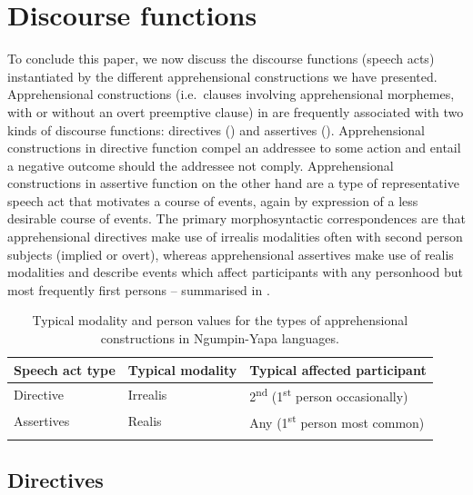 \documentclass[output=paper,colorlinks,citecolor=brown]{langscibook}
\begin{document}
\section{Discourse functions}
\label{sec:discourse}

To conclude this paper, we now discuss the discourse functions (speech acts) instantiated by the different apprehensional constructions we have presented. Apprehensional constructions (i.e.\  clauses involving apprehensional morphemes, with or without an overt preemptive clause) in  are frequently associated with two kinds of discourse functions: directives () and assertives (). Apprehensional constructions in directive function compel an addressee to some action and entail a negative outcome should the addressee not comply. Apprehensional constructions in assertive function on the other hand are a type of representative speech act that motivates a course of events, again by expression of a less desirable course of events. The primary morphosyntactic correspondences are that apprehensional directives make use of irrealis modalities often with second person subjects (implied or overt), whereas apprehensional assertives make use of realis modalities and describe events which affect participants with any personhood but most frequently first persons -- summarised in .

\begin{table}

\caption{Typical modality and person values for the types of apprehensional constructions in Ngumpin-Yapa languages.}
\label{tab9-bro}
\begin{tabular}{lll}
\lsptoprule
Speech act type & Typical modality & Typical affected participant \\ \midrule
Directive & Irrealis & 2\textsuperscript{nd} (1\textsuperscript{st} person occasionally) \\
Assertives & Realis & Any (1\textsuperscript{st} person most common) \\ 
\lspbottomrule
\end{tabular}
\end{table}


\subsection{Directives}
\label{subsec:directives}
\end{document}
